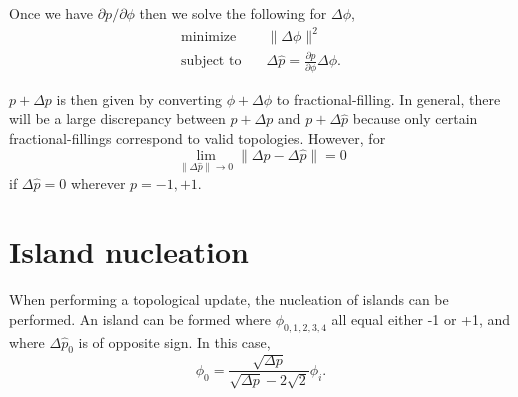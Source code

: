 \documentclass{article}
\begin{document}
Once we have $\partial p / \partial \phi$ then we solve the following for $\Delta \phi$,
\begin{align}
    \text{minimize} \quad & \| \Delta \phi \|^2 \\
    \text{subject to} \quad & \Delta \hat{p} = 
        \frac{\partial p}{\partial \phi} \Delta \phi.
\end{align}

$p + \Delta p$ is then given by converting $\phi + \Delta\phi$ to fractional-filling. In general, there will be a large discrepancy between $p + \Delta p$ and $p + \Delta \hat{p}$ because only certain fractional-fillings correspond to valid topologies. However, for 
\begin{equation}
    \lim_{\|\Delta\hat{p}\| \to 0} \|\Delta p - \Delta\hat{p}\| = 0
\end{equation}
if $\Delta\hat{p} = 0$ wherever $p = -1, +1$. 

\section{Island nucleation}
When performing a topological update, the nucleation of islands can be performed. An island can be formed where $\phi_{0,1,2,3,4}$ all equal either -1 or +1, and where $\Delta\hat{p}_0$ is of opposite sign. In this case,
\begin{equation}
\phi_0 = \frac{\sqrt{\Delta p}}{\sqrt{\Delta p} - 2\sqrt{2}} \phi_i.
\end{equation}    
\end{document}
